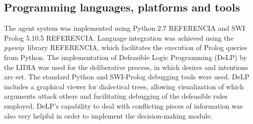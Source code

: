 



% 
%

\subsection{Programming languages, platforms and tools}
    The agent system was implemented using Python 2.7 REFERENCIA and SWI Prolog
    5.10.5 REFERENCIA.  Language integration was achieved using the
    \textit{pyswip}\ library REFERENCIA, which facilitates the execution of
    Prolog queries from Python.  The implementation of Defeasible Logic
    Programming (DeLP) by the LIDIA \cite{Garcia:2004a} was used for the
    deliberative process, in which desires and intentions are set.  The standard
    Python and SWI-Prolog debugging tools were used.  DeLP includes a graphical
    viewer for dialectical trees, allowing visualization of which arguments
    attack others and facilitating debugging of the defeasible rules employed.
    DeLP's capability to deal with conflicting pieces of information was also
    very helpful in order to implement the decision-making module.
    
